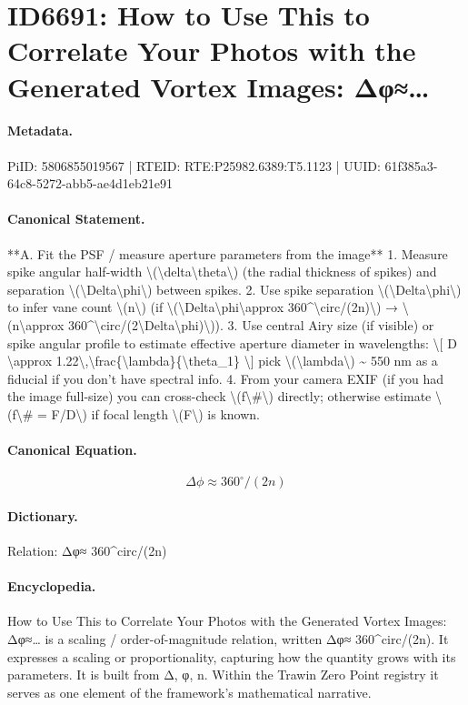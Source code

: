 \section*{ID6691: How to Use This to Correlate Your Photos with the Generated Vortex Images: Δφ≈…}
\paragraph{Metadata.}
PiID: 5806855019567 | RTEID: RTE:P25982.6389:T5.1123 | UUID: 61f385a3-64c8-5272-abb5-ae4d1eb21e91

\paragraph{Canonical Statement.}
**A. Fit the PSF / measure aperture parameters from the image** 1. Measure spike angular half-width \textbackslash{}(\textbackslash{}delta\textbackslash{}theta\textbackslash{}) (the radial thickness of spikes) and separation \textbackslash{}(\textbackslash{}Delta\textbackslash{}phi\textbackslash{}) between spikes. 2. Use spike separation \textbackslash{}(\textbackslash{}Delta\textbackslash{}phi\textbackslash{}) to infer vane count \textbackslash{}(n\textbackslash{}) (if \textbackslash{}(\textbackslash{}Delta\textbackslash{}phi\textbackslash{}approx 360\textasciicircum{}\textbackslash{}circ/(2n)\textbackslash{}) → \textbackslash{}(n\textbackslash{}approx 360\textasciicircum{}\textbackslash{}circ/(2\textbackslash{}Delta\textbackslash{}phi)\textbackslash{})). 3. Use central Airy size (if visible) or spike angular profile to estimate effective aperture diameter in wavelengths: \textbackslash{}[ D \textbackslash{}approx 1.22\textbackslash{},\textbackslash{}frac\{\textbackslash{}lambda\}\{\textbackslash{}theta\_1\} \textbackslash{}] pick \textbackslash{}(\textbackslash{}lambda\textbackslash{}) \textasciitilde{} 550 nm as a fiducial if you don’t have spectral info. 4. From your camera EXIF (if you had the image full-size) you can cross-check \textbackslash{}(f\textbackslash{}\#\textbackslash{}) directly; otherwise estimate \textbackslash{}(f\textbackslash{}\# = F/D\textbackslash{}) if focal length \textbackslash{}(F\textbackslash{}) is known.

\paragraph{Canonical Equation.}
\[
\Delta\phi\approx 360^\circ/(2n)
\]

\paragraph{Dictionary.}
Relation: Δφ≈ 360\textasciicircum{}circ/(2n)

\paragraph{Encyclopedia.}
How to Use This to Correlate Your Photos with the Generated Vortex Images: Δφ≈… is a scaling / order-of-magnitude relation, written Δφ≈ 360\textasciicircum{}circ/(2n). It expresses a scaling or proportionality, capturing how the quantity grows with its parameters. It is built from Δ, φ, n. Within the Trawin Zero Point registry it serves as one element of the framework's mathematical narrative.
